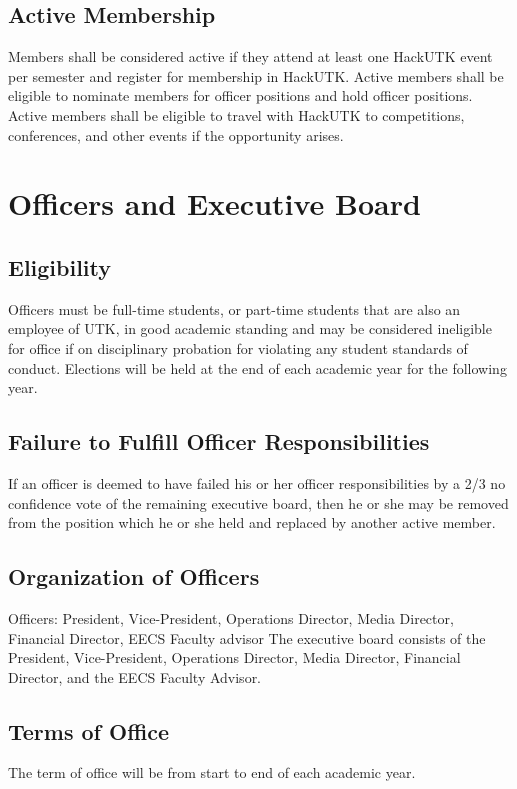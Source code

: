 \documentclass[12pt]{article}
\begin{document}
\subsection{Active Membership}
Members shall be considered active if they attend at least one HackUTK event per semester and register for membership in HackUTK. Active members shall be eligible to nominate members for officer positions and hold officer positions. Active members shall be eligible to travel with HackUTK to competitions, conferences, and other events if the opportunity arises. 

\section{Officers and Executive Board}
\subsection{Eligibility}
Officers must be full-time students, or part-time students that are also an employee of UTK, in good academic standing and may be considered ineligible for office if on disciplinary probation for violating any student standards of conduct. Elections will be held at the end of each academic year for the following year.

\subsection{Failure to Fulfill Officer Responsibilities}
If an officer is deemed to have failed his or her officer responsibilities by a 2/3 no confidence vote of the remaining executive board, then he or she may be removed from the position which he or she held and replaced by another active member.

\subsection{Organization of Officers}
Officers: President, Vice-President, Operations Director, Media Director, Financial Director, EECS Faculty advisor
The executive board consists of the President, Vice-President, Operations Director, Media Director, Financial Director, and the EECS Faculty Advisor.

\subsection{Terms of Office}
The term of office will be from start to end of each academic year.
\end{document}
